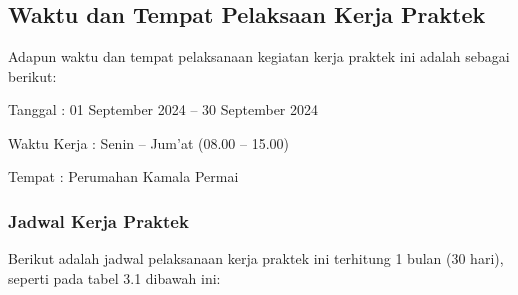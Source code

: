 %


%


\chapter{\babTiga}
\section{Waktu dan Tempat Pelaksaan Kerja Praktek}
Adapun waktu dan tempat pelaksanaan kegiatan kerja praktek ini adalah sebagai berikut:
\par Tanggal           : 01 September 2024 – 30 September 2024 
\par Waktu Kerja    : Senin – Jum’at (08.00 – 15.00)
\par Tempat            : Perumahan Kamala Permai


\subsection{Jadwal Kerja Praktek}
Berikut adalah jadwal pelaksanaan kerja praktek ini terhitung 1 bulan (30 hari), seperti pada tabel 3.1 dibawah ini:


